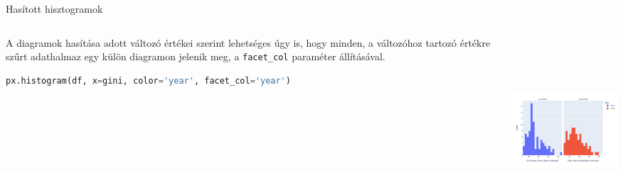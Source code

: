 \documentclass[english, aspectratio=169]{beamer}
\begin{document}
\begin{frame}[fragile]{Hasított hisztogramok}
	\begin{columns}
		\begin{column}{.5\textwidth}
			A diagramok hasítása adott változó értékei szerint lehetséges úgy is, hogy minden, a változóhoz tartozó értékre szűrt adathalmaz egy külön diagramon jelenik meg, a \texttt{facet\_col} paraméter állításával.\par\medskip
			\begin{lstlisting}[language=python]
px.histogram(df, x=gini, color='year', facet_col='year')
			\end{lstlisting}
		\end{column}
		\begin{column}{.5\textwidth}
			\begin{center}
				\includegraphics[width=7cm, height=7cm, keepaspectratio]{images/freq_7.png}
			\end{center}
		\end{column}
	\end{columns}
\end{frame}
\end{document}
